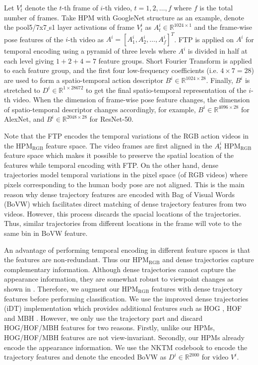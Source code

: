 \documentclass[twocolumn]{svjour3}          \smartqed  \usepackage{graphicx}
\begin{document}
Let $V_t^i$ denote the $t$-th frame of $i$-th video, $t=1,2,\dots,f$ where $f$ is the total number of frames. Take HPM with GoogleNet structure as an example, denote the pool5/7x7$\_$s1 layer activations of frame \(V_t^i \) as \(A_t^i \in \mathbb{R}^{1024 \times 1} \) and the frame-wise pose features of the $i$-th video as \(A^i=[A_1^i, A_2^i, \dots, A_f^i]^T\). FTP is applied on \(A^i\) for temporal encoding using a pyramid of three levels where \(A^i\) is divided in half at each level giving $1+2+4=7$ feature groups. Short Fourier Transform is applied to each feature group, and the first four low-frequency coefficients (i.e. $4 \times 7 = 28$) are used to form a spatio-temporal action descriptor $B^i \in \mathbb{R}^{1024 \times 28}$. Finally, $B^i$ is stretched to $D^i \in \mathbb{R}^{1 \times 28672}$ to get the final spatio-temporal representation of the $i$-th video. When the dimension of frame-wise pose feature changes, the dimension of spatio-temporal descriptor changes accordingly, for example, $B^i \in \mathbb{R}^{4096 \times 28}$ for AlexNet, and $B^i \in \mathbb{R}^{2048 \times 28}$ for ResNet-50.



Note that the FTP encodes the temporal variations of the RGB action videos in the HPM$_{\mathrm{RGB}}$ feature space. The video frames are first aligned in the $A_t^i$ HPM$_{\mathrm{RGB}}$ feature space which makes it possible to preserve the spatial location of the features while temporal encoding with FTP. On the other hand, dense trajectories model temporal variations in the pixel space (of RGB videos) where pixels corresponding to the human body pose are not aligned. This is the main reason why dense trajectory features are encoded with Bag of Visual Words (BoVW) which facilitates direct matching of dense trajectory features from two videos. However, this process discards the spacial locations of the trajectories. Thus, similar trajectories from different locations in the frame will vote to the same bin in BoVW feature.

An advantage of performing temporal encoding in different feature spaces is that the features are non-redundant. Thus our HPM$_{\mathrm{RGB}}$ and dense trajectories capture complementary information. Although dense trajectories cannot capture the appearance information, they are somewhat robust to viewpoint changes as shown in \citep{rahmani2017learning}. Therefore, we augment our HPM$_{\mathrm{RGB}}$ features with dense trajectory features before performing classification. We use the improved dense trajectories (iDT) \citep{wang2013action} implementation which provides additional features such as HOG \citep{dalal2005histograms}, HOF and MBH \citep{dalal2006human}. However, we only use the trajectory part and discard HOG/HOF/MBH features for two reasons. Firstly, unlike our HPMs, HOG/HOF/MBH features are not view-invariant. Secondly, our HPMs already encode the appearance information. We use the NKTM \citep{NKTM} codebook to encode the trajectory features and denote the encoded BoVW as $D^i \in \mathbb{R}^{2000}$ for video $V^i$.
\end{document}
